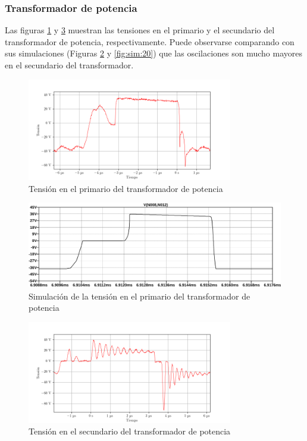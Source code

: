\subsubsection{Transformador de potencia}

Las figuras \ref{fig:osc:38} y \ref{fig:osc:40} muestran las tensiones en el primario y el secundario del transformador de potencia, respectivamente. Puede observarse comparando con sus simulaciones (Figuras \ref{fig:sim:19} y \ref{fig:sim:20}) que las oscilaciones son mucho mayores en el secundario del transformador.

\begin{figure}[H]
    \centering
    \includegraphics[width=0.8\textwidth]{images/capturas-osciloscopio/17-11-2022/38.png}
    \caption{Tensión en el primario del transformador de potencia}
    \label{fig:osc:38}
\end{figure}

\begin{figure}[H]
    \centering
    \includegraphics[width=\textwidth]{images/sim/19.pdf}
    \caption{Simulación de la tensión en el primario del transformador de potencia}
    \label{fig:sim:19}
\end{figure}

\begin{figure}[H]
    \centering
    \includegraphics[width=0.8\textwidth]{images/capturas-osciloscopio/17-11-2022/40.png}
    \caption{Tensión en el secundario del transformador de potencia}
    \label{fig:osc:40}
\end{figure}

